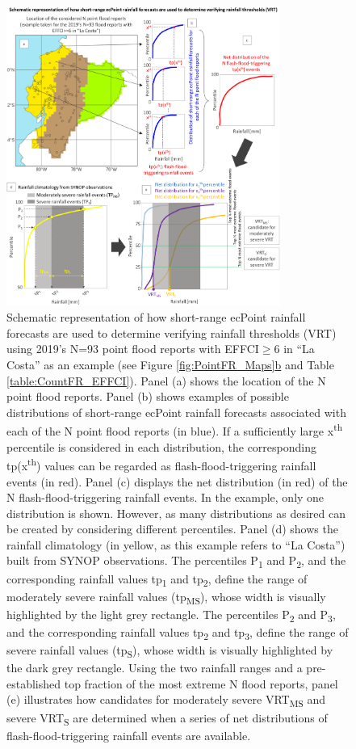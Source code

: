 \documentclass[techmemo]{ecmwfrep}%
\begin{document}
\begin{figure}
\centering
\includegraphics[width=0.8\textwidth]{Figures/08_METHODS_VRTs.png}
\caption{Schematic representation of how short-range ecPoint rainfall forecasts are used to determine verifying rainfall thresholds (VRT) using 2019's N=93 point flood reports with EFFCI$\geq$6 in “La Costa” as an example (see Figure \ref{fig:PointFR_Maps}\hyperref[fig:PointFR_Maps]{b} and Table \ref{table:CountFR_EFFCI}). Panel (a) shows the location of the N point flood reports. Panel (b) shows examples of possible distributions of short-range ecPoint rainfall forecasts associated with each of the N point flood reports (in blue). If a sufficiently large x\textsuperscript{th} percentile is considered in each distribution, the corresponding tp(x\textsuperscript{th}) values can be regarded as flash-flood-triggering rainfall events (in red). Panel (c) displays the net distribution (in red) of the N flash-flood-triggering rainfall events. In the example, only one distribution is shown. However, as many distributions as desired can be created by considering different percentiles. Panel (d) shows the rainfall climatology (in yellow, as this example refers to “La Costa”) built from SYNOP observations. The percentiles P\textsubscript{1} and P\textsubscript{2}, and the corresponding rainfall values tp\textsubscript{1} and tp\textsubscript{2}, define the range of moderately severe rainfall values (tp\textsubscript{MS}), whose width is visually highlighted by the light grey rectangle. The percentiles P\textsubscript{2} and P\textsubscript{3}, and the corresponding rainfall values tp\textsubscript{2} and tp\textsubscript{3}, define the range of severe rainfall values (tp\textsubscript{S}), whose width is visually highlighted by the dark grey rectangle. Using the two rainfall ranges and a pre-established top fraction of the most extreme N flood reports, panel (e) illustrates how candidates for moderately severe VRT\textsubscript{MS} and severe VRT\textsubscript{S} are determined when a series of net distributions of flash-flood-triggering rainfall events are available.}
\label{fig:Methods_VRT}
\end{figure}
\end{document}
